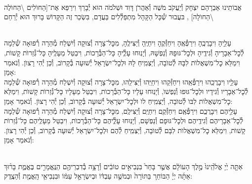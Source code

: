 \documentclass[twoside, openany, parskip=half, 11pt]{book}
\begin{document}
\begin{sometimes}
\\
אֲבוֹתֵינוּ אַבְרָהָם יִצְחָק וְ֯יַעֲקֹב מֹשֶׁה וְ֯אַהֲרֹן דָּוִד וּשְׁלֹמֹה הוּא יְ֯בָרֵךְ וִירַפֵּא אֶת־[הַחוׂלִים \textbackslash הַחוׂלֶה \textbackslash הַחוׂלָה]
,
בּעֲבוּר שְׁ֯כָּל הַקָּהָל מִתְפַּלְ֯לִים בַּעֲדָם, בִּשְׂכַר זֶה
הַקָּדוֹשׁ בָּרוּךְ הוּא יְ֯רַחֵם
\setcolumnwidth{1.4in,1.4in,1.4in}
\begin{paracol}{3}
\\
עָלֵָיהָ וִיבָרֲכֶֽהָ וִירַפְּ֯אֶֽהָ וִיחַזְּ֯קֶֽהָ וִיחַיֶּֽהָ וְ֯יַצִּילֶֽהָ, מִכׇּל־צָרָה וְ֯צוּקָה וְ֯יִשְׁלַח מְ֯הֵרָה רְ֯פוּאָה שְׁ֯לֵמָה לְ֯כׇל־אֵבָרָיהָ וְ֯גִידֶֽיהָ וּלְכׇל־גּוּפָהּ וְ֯נַפְשָׁהּ, וְ֯יָנֽוּחוּ עָלְֶ֯יהָ כָּל־הַבְּ֯רָכוׂת, וִיבַטֵּל מֵעָלֶֽיהָ כָּל־גְּ֯זֵרוׂת קָשׁוׂת, וִימַלֵּא כׇל־מִשְׁאֲלוׂת לִבָּהּ לְ֯טוׂבָה, וְ֯יַצְמִֽיחַ לָהּ וּלְכׇל־יִשְׂרָאֵל יְ֯שׁוּעָה בְּ֯קָרוׂב, וְ֯כֵן יְ֯הִי רָצוׂן. וְ֯נֹאמַר אָמֵן:
\switchcolumn
{}\\
עָלֵָיו וִיבָרֲכֵֽהוּ וִירַפְּ֯אֵֽהוּ וִיחַזְּ֯קֵהוּ וִיחַיֵּֽהוּ וְ֯יַצִּילֵֽהוּ, מִכׇּל־צָרָה וְ֯צוּקָה וְ֯יִשְׁלַח מְ֯הֵרָה רְ֯פוּאָה שְׁ֯לֵמָה לְ֯כׇל־אֵבָרָיו וְ֯גִידָיו וּלְכׇל־גּוּפוּ וְ֯נַפְשׁוׂ, וְ֯יָנֽוּחוּ עָלָיו כָּל־הַבְּ֯רָכוׂת, וִיבַטֵּל מֵעָלָיו כָּל־גְּ֯זֵרוׂת קָשׁוׂת, וִימַלֵּא כׇל־מִשְׁאֲלוׂת לִבּוׂ לְ֯טוׂבָה, וְ֯יַצְמִֽיחַ לוׂ וּלְכׇל־יִשְׂרָאֵל יְ֯שׁוּעָה בְּ֯קָרוׂב, וְ֯כֵן יְ֯הִי רָצוׂן. וְ֯נֹאמַר אָמֵן:
\switchcolumn
{}\\
עָלֵָיהֶם וִיבָרֲכְֶם וִירַפְּ֯אֶֽם וִיחַזְּ֯קֶֽם וִיחַיֶּֽם וְ֯יַצִּילֶֽם, מִכׇּל־צָרָה וְ֯צוּקָה וְ֯יִשְׁלַח מְ֯הֵרָה רְ֯פוּאָה שְׁ֯לֵמָה לְ֯כׇל־אֵבָרָיהֶם וְ֯גִידֶֽיהֶם וּלְכׇל־גּוּפָם וְ֯נַפְשָׁם, וְ֯יָנֽוּחוּ עָלְֶ֯יהֶם כָּל־הַבְּ֯רָכוׂת, וִיבַטֵּל מֵעָלֶֽיהֶם כָּל־גְּ֯זֵרוׂת קָשׁוׂת, וִימַלֵּא כׇל־מִשְׁאֲלוׂת לִבָּם לְ֯טוׂבָה, וְ֯יַצְמִֽיחַ לְ֯הֶם וּלְכׇל־יִשְׂרָאֵל יְ֯שׁוּעָה בְּ֯קָרוׂב, וְ֯כֵן יְ֯הִי רָצוׂן. וְ֯נֹאמַר אָמֵן:
\end{paracol}

\end{sometimes}

\halfkaddish

\hagbaha

\galila


\\
אַתָּ֤ה יְ֙יָ אֱלֹ֙הֵֽינוּ֙ מֶ֣לֶךְ הָעוֹלָ֔ם אֲשֶׁ֤ר בָּחַר֙ בִּנְבִיאִ֣ים טוֹבִ֔ים וְ֯רָצָ֥ה בְ֯דִבְרֵיהֶ֖ם הַנֶּֽאֱמָרִ֣ים בֶּאֱמֶ֑ת בָּר֨וּךְ אַתָּ֜ה יְיָ֗ הַבּוֹחֵר֚ בַּתּוֹרָה֙ וּבְמֹשֶׁ֣ה עַבְדּ֔וֹ וּבְיִשְׂרָאֵ֣ל עַמּ֔וֹ וּבִנְבִיאֵ֥י הָֽאֱמֶ֖ת וְ֯הַצֶֽדֶק:
\end{document}
